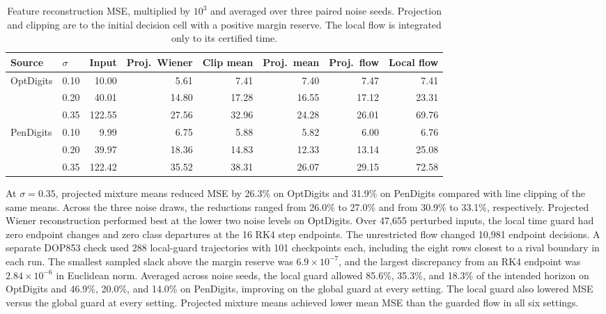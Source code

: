 \begin{table}[htbp]
\centering
\small
\setlength{\tabcolsep}{4pt}
\caption{Feature reconstruction MSE, multiplied by \(10^3\) and averaged over three paired noise seeds. Projection and clipping are to the initial decision cell with a positive margin reserve. The local flow is integrated only to its certified time.}
\label{tab:decision-safe-restoration}
\begin{tabular}{@{}llrrrrrr@{}}
\toprule
Source & \(\sigma\) & Input & Proj.\ Wiener & Clip mean & Proj.\ mean & Proj.\ flow & Local flow \\
\midrule
OptDigits & 0.10 & 10.00 & 5.61 & 7.41 & 7.40 & 7.47 & 7.41 \\
          & 0.20 & 40.01 & 14.80 & 17.28 & 16.55 & 17.12 & 23.31 \\
          & 0.35 & 122.55 & 27.56 & 32.96 & 24.28 & 26.01 & 69.76 \\
PenDigits & 0.10 & 9.99 & 6.75 & 5.88 & 5.82 & 6.00 & 6.76 \\
          & 0.20 & 39.97 & 18.36 & 14.83 & 12.33 & 13.14 & 25.08 \\
          & 0.35 & 122.42 & 35.52 & 38.31 & 26.07 & 29.15 & 72.58 \\
\bottomrule
\end{tabular}
\end{table}

At \(\sigma=0.35\), projected mixture means reduced MSE by 26.3\% on OptDigits and 31.9\% on PenDigits compared with line clipping of the same means. Across the three noise draws, the reductions ranged from 26.0\% to 27.0\% and from 30.9\% to 33.1\%, respectively. Projected Wiener reconstruction performed best at the lower two noise levels on OptDigits. Over 47,655 perturbed inputs, the local time guard had zero endpoint changes and zero class departures at the 16 RK4 step endpoints. The unrestricted flow changed 10,981 endpoint decisions. A separate DOP853 check used 288 local-guard trajectories with 101 checkpoints each, including the eight rows closest to a rival boundary in each run. The smallest sampled slack above the margin reserve was \(6.9\times10^{-7}\), and the largest discrepancy from an RK4 endpoint was \(2.84\times10^{-6}\) in Euclidean norm. Averaged across noise seeds, the local guard allowed 85.6\%, 35.3\%, and 18.3\% of the intended horizon on OptDigits and 46.9\%, 20.0\%, and 14.0\% on PenDigits, improving on the global guard at every setting. The local guard also lowered MSE versus the global guard at every setting. Projected mixture means achieved lower mean MSE than the guarded flow in all six settings.

